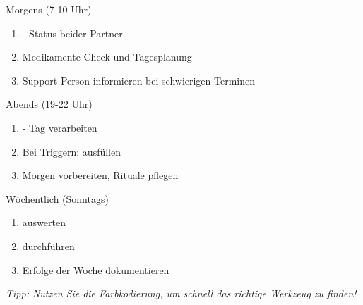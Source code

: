 \begin{ctmmGreenBox}{Morgens (7-10 Uhr)}
\begin{enumerate}
    \item {} - Status beider Partner
    \item Medikamente-Check und Tagesplanung
    \item Support-Person informieren bei schwierigen Terminen
\end{enumerate}
\end{ctmmGreenBox}

\begin{ctmmYellowBox}{Abends (19-22 Uhr)}
\begin{enumerate}
    \item {} - Tag verarbeiten
    \item Bei Triggern:  ausfüllen
    \item Morgen vorbereiten, Rituale pflegen
\end{enumerate}
\end{ctmmYellowBox}

\begin{ctmmRedBox}{Wöchentlich (Sonntags)}
\begin{enumerate}
    \item {} auswerten
    \item {} durchführen
    \item Erfolge der Woche dokumentieren
\end{enumerate}
\end{ctmmRedBox}

\vspace{0.5cm}

\textit{Tipp: Nutzen Sie die Farbkodierung, um schnell das richtige Werkzeug zu finden!}
